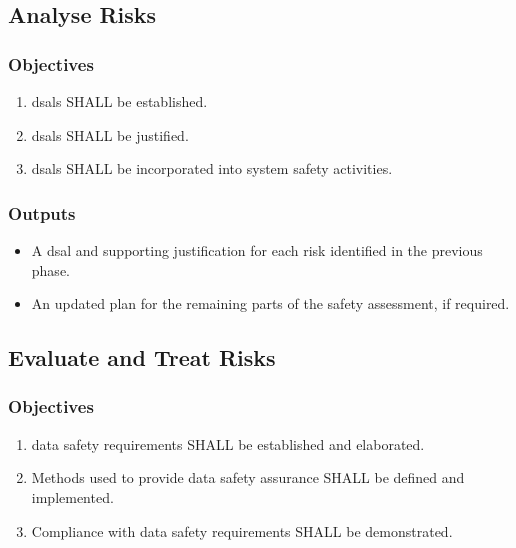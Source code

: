 \subsection{Analyse Risks}
\subsubsection{Objectives}
\begin{enumerate}[label=\color{dsiwgAccentColour}{3-\arabic*}]
	\item \Glspl{dsal} SHALL be established.
	\item \Glspl{dsal} SHALL be justified.
	\item \Glspl{dsal} SHALL be incorporated into system safety activities.
\end{enumerate}

\subsubsection{Outputs}
\begin{itemize}
	\item A \gls{dsal} and supporting justification for each risk identified in the previous phase.
	\item An updated plan for the remaining parts of the \gls{safety assessment}, if required.
\end{itemize}

\subsection{Evaluate and Treat Risks}
\subsubsection{Objectives}
\begin{enumerate}[label=\color{dsiwgAccentColour}{4-\arabic*}]
	\item {}\Glspl{data safety requirement} SHALL be established and elaborated.
	\item Methods used to provide data safety assurance SHALL be defined and implemented.
	\item Compliance with \glspl{data safety requirement} SHALL be demonstrated.	
\end{enumerate}


